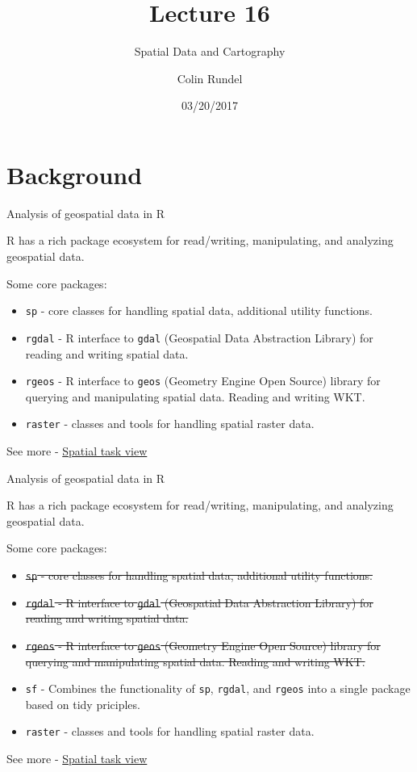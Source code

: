 \documentclass[11pt,ignorenonframetext,]{beamer}
\title{Lecture 16}
\subtitle{Spatial Data and Cartography}
\author{Colin Rundel}
\date{03/20/2017}
\begin{document}
\frame{\titlepage}

\section{Background}\label{background}

\begin{frame}[fragile]{Analysis of geospatial data in R}

R has a rich package ecosystem for read/writing, manipulating, and
analyzing geospatial data.

Some core packages:

\begin{itemize}
\item
  \texttt{sp} - core classes for handling spatial data, additional
  utility functions.
\item
  \texttt{rgdal} - R interface to \texttt{gdal} (Geospatial Data
  Abstraction Library) for reading and writing spatial data.
\item
  \texttt{rgeos} - R interface to \texttt{geos} (Geometry Engine Open
  Source) library for querying and manipulating spatial data. Reading
  and writing WKT.
\item
  \texttt{raster} - classes and tools for handling spatial raster data.
\end{itemize}

See more -
\href{http://cran.r-project.org/web/views/Spatial.html}{Spatial task
view}

\end{frame}

\begin{frame}[fragile]{Analysis of geospatial data in R}

R has a rich package ecosystem for read/writing, manipulating, and
analyzing geospatial data.

Some core packages:

\begin{itemize}
\item
  \sout{\texttt{sp} - core classes for handling spatial data, additional
  utility functions.}
\item
  \sout{\texttt{rgdal} - R interface to \texttt{gdal} (Geospatial Data
  Abstraction Library) for reading and writing spatial data.}
\item
  \sout{\texttt{rgeos} - R interface to \texttt{geos} (Geometry Engine
  Open Source) library for querying and manipulating spatial data.
  Reading and writing WKT.}
\item
  \texttt{sf} - Combines the functionality of \texttt{sp},
  \texttt{rgdal}, and \texttt{rgeos} into a single package based on tidy
  priciples.
\item
  \texttt{raster} - classes and tools for handling spatial raster data.
\end{itemize}

See more -
\href{http://cran.r-project.org/web/views/Spatial.html}{Spatial task
view}

\end{frame}
\end{document}
